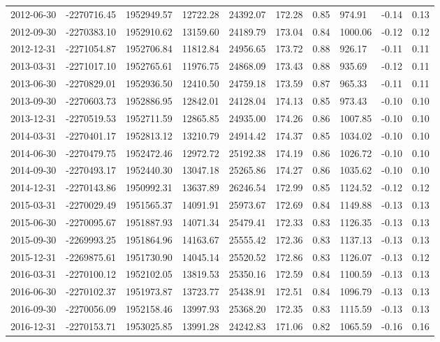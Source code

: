 \begin{landscape}
\begin{longtable}{llllllllll}
2012-06-30 & -2270716.45 & 1952949.57 & 12722.28 & 24392.07 & 172.28 & 0.85 & 974.91  & -0.14 & 0.13 \\
2012-09-30 & -2270383.10 & 1952910.62 & 13159.60 & 24189.79 & 173.04 & 0.84 & 1000.06 & -0.12 & 0.12 \\
2012-12-31 & -2271054.87 & 1952706.84 & 11812.84 & 24956.65 & 173.72 & 0.88 & 926.17  & -0.11 & 0.11 \\
2013-03-31 & -2271017.10 & 1952765.61 & 11976.75 & 24868.09 & 173.43 & 0.88 & 935.69  & -0.12 & 0.11 \\
2013-06-30 & -2270829.01 & 1952936.50 & 12410.50 & 24759.18 & 173.59 & 0.87 & 965.33  & -0.11 & 0.11 \\
2013-09-30 & -2270603.73 & 1952886.95 & 12842.01 & 24128.04 & 174.13 & 0.85 & 973.43  & -0.10 & 0.10 \\
2013-12-31 & -2270519.53 & 1952711.59 & 12865.85 & 24935.00 & 174.26 & 0.86 & 1007.85 & -0.10 & 0.10 \\
2014-03-31 & -2270401.17 & 1952813.12 & 13210.79 & 24914.42 & 174.37 & 0.85 & 1034.02 & -0.10 & 0.10 \\
2014-06-30 & -2270479.75 & 1952472.46 & 12972.72 & 25192.38 & 174.19 & 0.86 & 1026.72 & -0.10 & 0.10 \\
2014-09-30 & -2270493.17 & 1952440.30 & 13047.18 & 25265.86 & 174.27 & 0.86 & 1035.62 & -0.10 & 0.10 \\
2014-12-31 & -2270143.86 & 1950992.31 & 13637.89 & 26246.54 & 172.99 & 0.85 & 1124.52 & -0.12 & 0.12 \\
2015-03-31 & -2270029.49 & 1951565.37 & 14091.91 & 25973.67 & 172.69 & 0.84 & 1149.88 & -0.13 & 0.13 \\
2015-06-30 & -2270095.67 & 1951887.93 & 14071.34 & 25479.41 & 172.33 & 0.83 & 1126.35 & -0.13 & 0.13 \\
2015-09-30 & -2269993.25 & 1951864.96 & 14163.67 & 25555.42 & 172.36 & 0.83 & 1137.13 & -0.13 & 0.13 \\
2015-12-31 & -2269875.61 & 1951730.90 & 14045.14 & 25520.52 & 172.86 & 0.83 & 1126.07 & -0.13 & 0.12 \\
2016-03-31 & -2270100.12 & 1952102.05 & 13819.53 & 25350.16 & 172.59 & 0.84 & 1100.59 & -0.13 & 0.13 \\
2016-06-30 & -2270102.37 & 1951973.87 & 13723.77 & 25438.91 & 172.51 & 0.84 & 1096.79 & -0.13 & 0.13 \\
2016-09-30 & -2270056.09 & 1952158.46 & 13997.93 & 25368.20 & 172.35 & 0.83 & 1115.59 & -0.13 & 0.13 \\
2016-12-31 & -2270153.71 & 1953025.85 & 13991.28 & 24242.83 & 171.06 & 0.82 & 1065.59 & -0.16 & 0.16 \\

\end{longtable}
\end{landscape}
